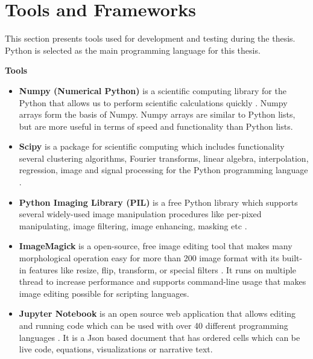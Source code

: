 \section{Tools and Frameworks}

    This section presents tools used for development and testing during the thesis. Python is selected as the main programming language for this thesis.

    \textbf{Tools}

        \begin{itemize}

            \item \textbf{Numpy (Numerical Python)} is a scientific computing library for the Python that allows us
                    to perform scientific calculations quickly \cite{oliphant2006guide}. Numpy arrays form the basis of Numpy.
                    Numpy arrays are similar to Python lists, but are more useful in terms of speed and functionality than Python lists.

            \item \textbf{Scipy} is a package for scientific computing which includes functionality several clustering algorithms,
                    Fourier transforms, linear algebra, interpolation, regression, image and signal processing for the Python programming language \cite{virtanen2020scipy}.

            \item \textbf{Python Imaging Library (PIL)} is a free Python library which supports several widely-used image manipulation procedures
                    like per-pixed manipulating, image filtering, image enhancing, masking etc \cite{anjal2019roi}.

            \item \textbf{ImageMagick} is a open-source, free image editing tool that makes many morphological operation easy
                    for more than 200 image format with its built-in features like resize, flip, transform, or special filters \cite{ImageMag68online}.
                    It runs on multiple thread to increase performance and supports command-line usage that makes image editing possible for scripting languages.

            \item \textbf{Jupyter Notebook} is an open source web application that allows editing and running code
                    which can be used with over 40 different programming languages \cite{kluyver2016jupyter}.
                    It is a Json based document that has ordered cells which can be live code, equations, visualizations or narrative text.

        \end{itemize}

